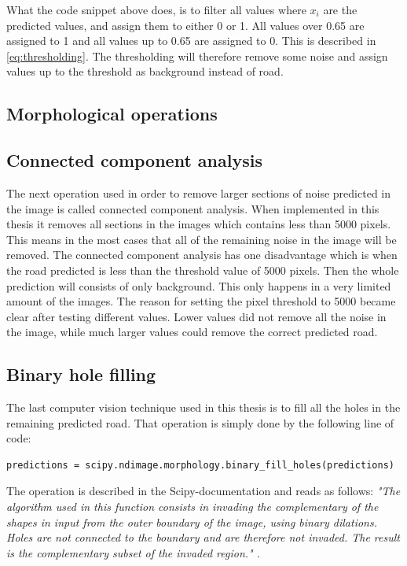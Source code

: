 \documentclass[USenglish]{ifimaster}  %
\begin{document}
What the code snippet above does, is to filter all values where $x_i$ are the predicted values, and assign them to either 0 or 1. All values over 0.65 are assigned to 1 and all values up to 0.65 are assigned to 0. This is described in \cref{eq:thresholding}. The thresholding will therefore remove some noise and assign values up to the threshold as background instead of road.

\subsection{Morphological operations}
\subsection{Connected component analysis}
The next operation used in order to remove larger sections of noise predicted in the image is called connected component analysis. When implemented in this thesis it removes all sections in the images which contains less than 5000 pixels. This means in the most cases that all of the remaining noise in the image will be removed. The connected component analysis has one disadvantage which is when the road predicted is less than the threshold value of 5000 pixels. Then the whole prediction will consists of only background. This only happens in a very limited amount of the images. The reason for setting the pixel threshold to 5000 became clear after testing different values. Lower values did not remove all the noise in the image, while much larger values could remove the correct predicted road. 
\subsection{Binary hole filling}
The last computer vision technique used in this thesis is to fill all the holes in the remaining predicted road. That operation is simply done by the following line of code:
\begin{verbatim}
predictions = scipy.ndimage.morphology.binary_fill_holes(predictions)
\end{verbatim}

The operation is described in the Scipy-documentation and reads as follows:
\newline
\newline
\textit{"The algorithm used in this function consists in invading the complementary of the shapes in input from the outer boundary of the image, using binary dilations. Holes are not connected to the boundary and are therefore not invaded. The result is the complementary subset of the invaded region." \cite{website:scipy}.} 
\end{document}
